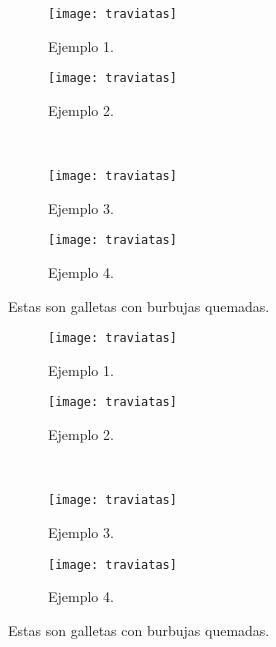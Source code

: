 \begin{figure}
    \centering
    \begin{subfigure}[b]{0.2\linewidth}
        \texttt{[image: traviatas]}
        \caption[Traviatas]{Ejemplo 1.}  
    \end{subfigure}
    \begin{subfigure}[b]{0.2\linewidth}
        \texttt{[image: traviatas]}
        \caption[Traviatas]{Ejemplo 2.} 
    \end{subfigure}
    \\ %
    \begin{subfigure}[b]{0.2\linewidth}
        \texttt{[image: traviatas]}
        \caption[Traviatas]{Ejemplo 3.}  
    \end{subfigure}
    \begin{subfigure}[b]{0.2\linewidth}
        \texttt{[image: traviatas]}
        \caption[Traviatas]{Ejemplo 4.} 
    \end{subfigure}
    \caption[Traviatas]{Estas son galletas  con burbujas quemadas.}
    \label{fig:4traviatas}    
\end{figure}



\begin{figure}
    \centering
    \begin{subfigure}[b]{0.2\linewidth}
        \texttt{[image: traviatas]}
        \caption[Traviatas]{Ejemplo 1.}  
    \end{subfigure}
    \hspace{0.1\linewidth} %
    \begin{subfigure}[b]{0.2\linewidth}
        \texttt{[image: traviatas]}
        \caption[Traviatas]{Ejemplo 2.} 
    \end{subfigure}
    \\ %
    \vspace{0.1\linewidth} %
    \begin{subfigure}[b]{0.2\linewidth}
        \texttt{[image: traviatas]}
        \caption[Traviatas]{Ejemplo 3.}  
    \end{subfigure}
    \hspace{1em} %
    \begin{subfigure}[b]{0.2\linewidth}
        \texttt{[image: traviatas]}
        \caption[Traviatas]{Ejemplo 4.} 
    \end{subfigure}
    \caption[Traviatas]{Estas son galletas  con burbujas quemadas.}
    \label{fig:4traviatas_otras}    
\end{figure}




